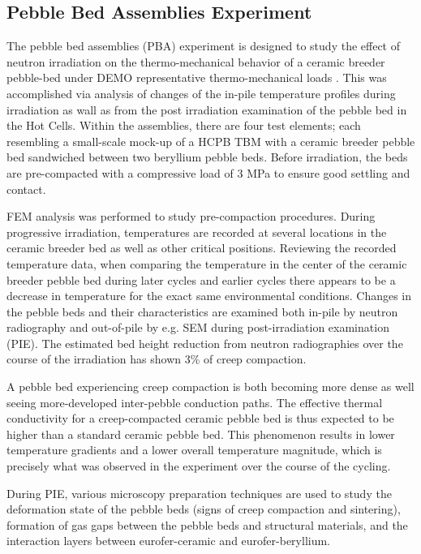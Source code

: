 \subsection{Pebble Bed Assemblies Experiment}
The pebble bed assemblies (PBA) experiment is designed to study the effect of neutron irradiation on the thermo-mechanical behavior of a ceramic breeder pebble-bed under DEMO representative thermo-mechanical loads \cite{Magielsen2007}. This was accomplished via analysis of changes of the in-pile temperature profiles during irradiation as wall as from the post irradiation examination of the pebble bed in the Hot Cells. Within the assemblies, there are four test elements; each resembling a small-scale mock-up of a HCPB TBM with a ceramic breeder pebble bed sandwiched between two beryllium pebble beds. Before irradiation, the beds are pre-compacted with a compressive load of 3 MPa to ensure good settling and contact.  

FEM analysis was performed to study pre-compaction procedures.  During progressive irradiation, temperatures are recorded at several locations in the ceramic breeder bed as well as other critical positions. Reviewing the recorded temperature data, when comparing the temperature in the center of the ceramic breeder pebble bed during later cycles and earlier cycles there appears to be a decrease in temperature for the exact same environmental conditions. Changes in the pebble beds and their characteristics are examined both in-pile by neutron radiography and out-of-pile by e.g. SEM during post-irradiation examination (PIE). The estimated bed height reduction from neutron radiographies over the course of the irradiation has shown 3\% of creep compaction. 

A pebble bed experiencing creep compaction is both becoming more dense as well seeing more-developed inter-pebble conduction paths. The effective thermal conductivity for a creep-compacted ceramic pebble bed is thus expected to be higher than a standard ceramic pebble bed. This phenomenon results in lower temperature gradients and a lower overall temperature magnitude, which is precisely what was observed in the experiment over the course of the cycling. 

During PIE, various microscopy preparation techniques are used to study the deformation state of the pebble beds (signs of creep compaction and sintering), formation of gas gaps between the pebble beds and structural materials, and the interaction layers between eurofer-ceramic and eurofer-beryllium. 

